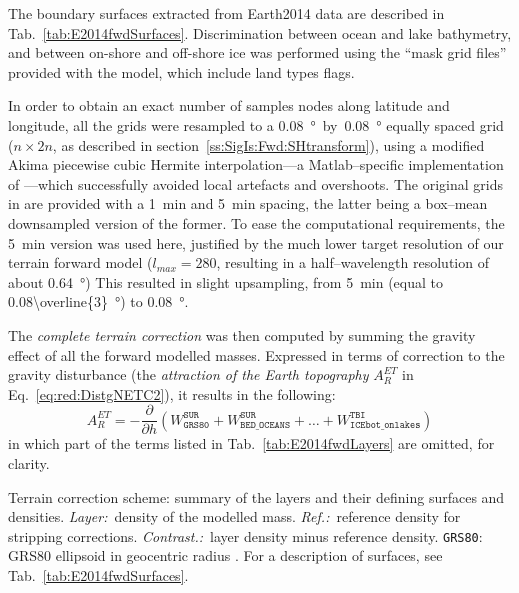 The boundary surfaces extracted from {Earth2014} data are described in Tab.~\ref{tab:E2014fwdSurfaces}.
Discrimination between ocean and lake bathymetry, and between on-shore and off-shore ice was performed using the ``mask grid files'' provided with the model, which include land types flags.

In order to obtain an exact number of samples nodes along latitude and longitude, all the grids were resampled to a \SI{0.08}{\degree}~by~\SI{0.08}{\degree} equally spaced grid ($n \times 2n$, as described in section~\ref{ss:SigIs:Fwd:SHtransform}), using a modified Akima piecewise cubic Hermite interpolation---a Matlab--specific implementation of \textcite{Akima1974}---which successfully avoided local artefacts and overshoots.
The original grids in \textcite{Hirt2015} are provided with a \SI{1}{min} and \SI{5}{min} spacing, the latter being a box--mean downsampled version of the former.
To ease the computational requirements, the \SI{5}{min} version was used here, justified by the much lower target resolution of our terrain forward model ($l_{max} = \num{280}$, resulting in a half--wavelength resolution of about \SI{0,64}{\degree})
This resulted in slight upsampling, from \SI{5}{min} (equal to \SI[parse-numbers=false]{0.08\overline{3}}{\degree}) to \SI{0.08}{\degree}.

The \textit{complete terrain correction} was then computed by summing the gravity effect of all the forward modelled masses.
Expressed in terms of correction to the gravity disturbance (the \textit{attraction of the Earth topography} $A_{R}^{ET}$ in Eq.~\ref{eq:red:DistgNETC2}), it results in the following:
\begin{equation}
    \label{eq:}
    A_{R}^{ET} =
    -\frac{\partial}{\partial h}
    \left(
        W^{\mathtt{SUR}}_{\mathtt{GRS80}} +
        W^{\mathtt{SUR}}_{\mathtt{BED\_OCEANS}} +
        \dots +
        W^{\mathtt{TBI}}_{\mathtt{ICEbot\_onlakes}}
    \right)
\end{equation}
in which part of the terms listed in Tab.~\ref{tab:E2014fwdLayers} are omitted, for clarity.

\begin{table}[ht]
    \begin{adjustbox}{center}
        
    \end{adjustbox}
    \caption[Terrain correction scheme: summary of the layers and their defining surfaces and densities.]{
        Terrain correction scheme: summary of the layers and their defining surfaces and densities.
        \textit{Layer:}~density of the modelled mass.
        \textit{Ref.:}~reference density for stripping corrections.
        \textit{Contrast.:}~layer density minus reference density.
        \texttt{GRS80}: GRS80 ellipsoid in geocentric radius \parencites{Moritz1980_GRS80}{Moritz2000_GRS80}. For a description of surfaces, see Tab.~\ref{tab:E2014fwdSurfaces}.}
    \label{tab:E2014fwdLayers}
\end{table}

